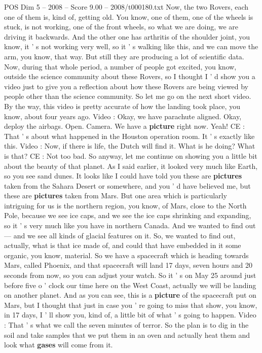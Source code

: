 \begin{textsample}{POS Dim 5 – 2008 – Score 9.00 – 2008/t000180.txt}
Now, the two Rovers, each one of them is, kind of, getting old.
You know, one of them, one of the wheels is stuck, is not working, one of the front wheels, so what we are doing, we are driving it backwards.
And the other one has arthritis of the shoulder joint, you know, it ' s not working very well, so it ' s walking like this, and we can move the arm, you know, that way.
But still they are producing a lot of scientific data.
Now, during that whole period, a number of people got excited, you know, outside the science community about these Rovers, so I thought I ' d show you a video just to give you a reflection about how these Rovers are being viewed by people other than the science community.
So let me go on the next short video.
By the way, this video is pretty accurate of how the landing took place, you know, about four years ago.
Video : Okay, we have parachute aligned.
Okay, deploy the airbags.
Open.
Camera.
We have a \textbf{picture} right now.
Yeah!
CE : That ' s about what happened in the Houston operation room.
It ' s exactly like this.
Video : Now, if there is life, the Dutch will find it.
What is he doing?
What is that?
CE : Not too bad.
So anyway, let me continue on showing you a little bit about the beauty of that planet.
As I said earlier, it looked very much like Earth, so you see sand dunes.
It looks like I could have told you these are \textbf{pictures} taken from the Sahara Desert or somewhere, and you ' d have believed me, but these are \textbf{pictures} taken from Mars.
But one area which is particularly intriguing for us is the northern region, you know, of Mars, close to the North Pole, because we see ice caps, and we see the ice caps shrinking and expanding, so it ' s very much like you have in northern Canada.
And we wanted to find out — and we see all kinds of glacial features on it.
So, we wanted to find out, actually, what is that ice made of, and could that have embedded in it some organic, you know, material.
So we have a spacecraft which is heading towards Mars, called Phoenix, and that spacecraft will land 17 days, seven hours and 20 seconds from now, so you can adjust your watch.
So it ' s on May 25 around just before five o ' clock our time here on the West Coast, actually we will be landing on another planet.
And as you can see, this is a \textbf{picture} of the spacecraft put on Mars, but I thought that just in case you ' re going to miss that show, you know, in 17 days, I ' ll show you, kind of, a little bit of what ' s going to happen.
Video : That ' s what we call the seven minutes of terror.
So the plan is to dig in the soil and take samples that we put them in an oven and actually heat them and look what \textbf{gases} will come from it.

\end{textsample}
